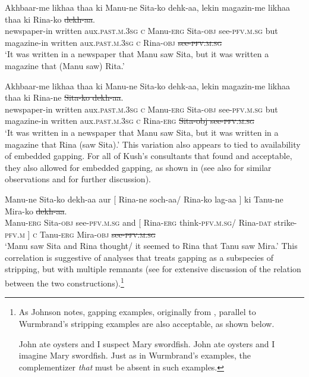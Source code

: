 \documentclass[output=paper]{langscibook}
\begin{document}
\ea \label{maex11}
    \gll Akhbaar-me likhaa thaa ki Manu-ne Sita-ko dehk-aa, lekin magazin-me likhaa thaa ki Rina-ko \sout{dekh-aa}.\\
    newspaper-in written aux.\textsc{past.m.3sg} \textsc{c} Manu-\textsc{erg} Sita-\textsc{obj} see-\textsc{pfv.m.sg} but magazine-in written aux.\textsc{past.m.3sg} \textsc{c} Rina-\textsc{obj} \sout{see-\textsc{pfv.m.sg}}\\
    \glt `It was written in a newspaper that Manu saw Sita, but it was written a magazine that (Manu saw) Rita.'
    
\ex \label{maex12}
    \gll Akhbaar-me likhaa thaa ki Manu-ne Sita-ko dehk-aa, lekin magazin-me likhaa thaa ki Rina-ne \sout{Sita-ko dekh-aa}.\\
    newspaper-in written aux.\textsc{past.m.3sg} \textsc{c} Manu-\textsc{erg} Sita-\textsc{obj} see-\textsc{pfv.m.sg} but magazine-in written aux.\textsc{past.m.3sg} \textsc{c} Rina-\textsc{erg} \sout{Sita-obj see-\textsc{pfv.m.sg}}\\
    \glt `It was written in a newspaper that Manu saw Sita, but it was written in a magazine that Rina (saw Sita).' \hfill \citep[70 \& 71]{kush16}
\z 
This variation also appears to tied to availability of embedded gapping. For all of Kush's consultants that found  and  acceptable, they also allowed for embedded gapping, as shown in  (see also \citealt{farudi2013} for similar observations and for further discussion).

\ea \label{maex13}
    \gll Manu-ne Sita-ko dekh-aa aur [ Rina-ne soch-aa/ Rina-ko lag-aa ] ki Tanu-ne Mira-ko \sout{dekh-aa}.\\
    Manu-\textsc{erg} Sita-\textsc{obj} see-\textsc{pfv.m.sg} and [ Rina-\textsc{erg} think-\textsc{pfv.m.sg}/ Rina-\textsc{dat} strike-\textsc{pfv.m} ] \textsc{c} Tanu-\textsc{erg} Mira-\textsc{obj} \sout{see-\textsc{pfv.m.sg}}\\
    \glt `Manu saw Sita and Rina thought/ it seemed to Rina that Tanu saw Mira.' \hfill \citep[53]{kush16}
\z 
This correlation is suggestive of analyses that treats gapping as a subspecies of stripping, but with multiple remnants (see \citealt{johnson18} for extensive discussion of the relation between the two constructions).\footnote{As Johnson notes, gapping examples, originally from \citet{weir14}, parallel to Wurmbrand's stripping examples are also acceptable, as shown below.

\ea 
    \ea 
        John ate oysters and I suspect Mary swordfish.
    \ex 
        John ate oysters and I imagine Mary swordfish. \hfill \citep[333]{weir14}
    \z 
\z 
Just as in Wurmbrand's examples, the complementizer \emph{that} must be absent in such examples.}
\end{document}
